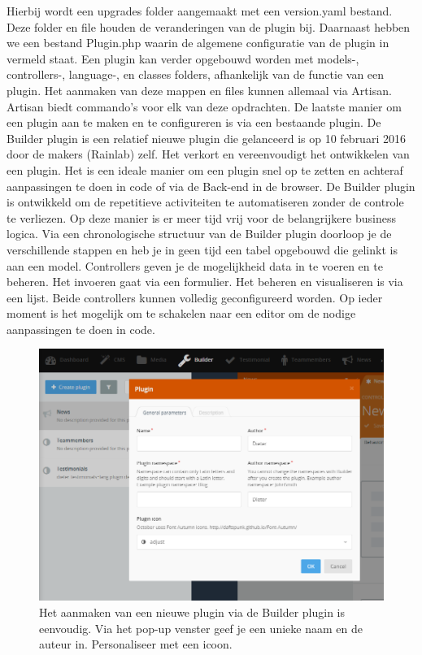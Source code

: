 \noindent
Hierbij wordt een upgrades folder aangemaakt met een version.yaml bestand. Deze folder en file houden de veranderingen van de plugin bij. Daarnaast hebben we een bestand Plugin.php waarin de algemene configuratie van de plugin in vermeld staat. Een plugin kan verder opgebouwd worden met models-, controllers-, language-, en classes folders, afhankelijk van de functie van een plugin. 
\newline\newline
Het aanmaken van deze mappen en files kunnen allemaal via Artisan. Artisan biedt commando's voor elk van deze opdrachten. 
\newline\newline
De laatste manier om een plugin aan te maken en te configureren is via een bestaande plugin. De Builder plugin is een relatief nieuwe plugin die gelanceerd is op 10 februari 2016 door de makers (Rainlab) zelf. Het verkort en vereenvoudigt het ontwikkelen van een plugin. Het is een ideale manier om een plugin snel op te zetten en achteraf aanpassingen te doen in code of via de Back-end in de browser. De Builder plugin is ontwikkeld om de repetitieve activiteiten te automatiseren zonder de controle te verliezen. Op deze manier is er meer tijd vrij voor de belangrijkere business logica. 
\newline\newline
Via een chronologische structuur van de Builder plugin doorloop je de verschillende stappen en heb je in geen tijd een tabel opgebouwd die gelinkt is aan een model. Controllers geven je de mogelijkheid data in te voeren en te beheren. Het invoeren gaat via een formulier. Het beheren en visualiseren is via een lijst. Beide controllers kunnen volledig geconfigureerd worden. Op ieder moment is het mogelijk om te schakelen naar een editor om de nodige aanpassingen te doen in code.

\begin{figure}[!ht]
  \includegraphics[width=\textwidth]{img/oc-builder-create.png}
  \caption{Het aanmaken van een nieuwe plugin via de Builder plugin is eenvoudig. Via het pop-up venster geef je een unieke naam en de auteur in. Personaliseer met een icoon.}
  \label{fig:Builder Plugin, Plugin aanmaken}
\end{figure}


